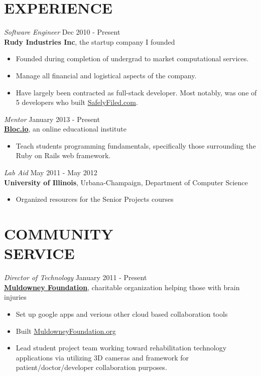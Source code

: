 \documentclass[margin]{res}
\begin{document}
\begin{resume}
\section{EXPERIENCE} 
  {\sl Software Engineer} \hfill Dec 2010 - Present \\
  {\bf Rudy Industries Inc}, the startup company I founded
  \begin{itemize}  
    \itemsep -2pt %
    \item Founded during completion of undergrad to market computational
      services.
    \item Manage all financial and logistical aspects of the company.
    \item Have largely been contracted as full-stack developer. Most notably, 
      was one of 5 developers who built 
      \href{https://safelyfiled.com/home/}{SafelyFiled.com}.
    \end{itemize}
 
  {\sl Mentor} \hfill January 2013 - Present \\
    {\bf \href{https://www.bloc.io/}{Bloc.io}}, an online educational institute 
    \begin{itemize}  
        \item Teach students programming fundamentals, specifically those
        surrounding the Ruby on Rails web framework.
     \end{itemize} 
  {\sl Lab Aid} \hfill May 2011 - May 2012 \\
    {\bf University of Illinois}, Urbana-Champaign, Department of Computer Science
    \begin{itemize}
      \itemsep -2pt %
      \item Organized resources for the Senior Projects courses
    \end{itemize} 
 
\section{COMMUNITY \\ SERVICE}  
  {\sl Director of Technology} \hfill January 2011 - Present \\
  {\bf \href{http://www.muldowneyfoundation.org/}{Muldowney Foundation}}, 
    charitable organization helping those with brain injuries
    \begin{itemize}
      \itemsep -2pt %
      \item Set up google apps and verious other cloud based collaboration tools
      \item Built \href{http://www.muldowneyfoundation.org/}{MuldowneyFoundation.org}
      \item Lead student project team working toward
          rehabilitation technology applications via utilizing 3D cameras and
          framework for patient/doctor/developer collaboration purposes.
    \end{itemize}


\end{resume}
\end{document}
